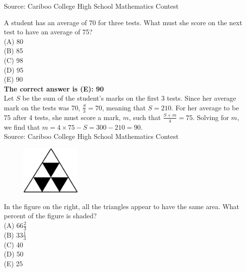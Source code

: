 \documentclass{article}
\begin{document}
\scriptsize
Source: Cariboo College High School Mathematics Contest

\normalsize
A student has an average of 70 for three tests. What must she score on the next test to have an average of 75?\\
(A) 80\\
(B) 85\\
(C) 98\\
(D) 95\\
(E) 90\\


\textbf{The correct answer is (E): 90}\\[1 ex]
Let $S$ be the sum of the student's marks on the first 3 tests. Since her average mark on the tests was 70, $\frac{S}{3}=70$, meaning that $S=210$. For her average to be 75 after 4 tests, she must score a mark, $m$, such that $\frac{S+m}{4}=75$. Solving for $m$, we find that $m=4\times75-S=300-210=90$.
\\[5 ex]

\scriptsize
Source: Cariboo College High School Mathematics Contest

\normalsize
\begin{figure}
	\includegraphics[width=30mm,viewport=33 187 502 584]{CCJPR73-10pic.eps}
\end{figure}
In the figure on the right, all the triangles appear to have the same area.  What percent of the figure is shaded?\\
(A) $66\frac{2}{3}$\\
(B) $33\frac{1}{3}$\\
(C) 40\\
(D) 50\\
(E) 25\\
\end{document}
